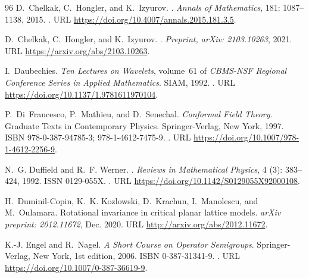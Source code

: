 \documentclass[a4paper, 11pt]{article}
\DeclareMathOperator{\1}{\mathds{1}}
\begin{document}
\begin{thebibliography}{96}
D.~Chelkak, C.~Hongler, and K.~Izyurov.
.
\newblock \emph{Annals of Mathematics}, 181: 1087--1138, 2015.
\newblock {}.
\newblock URL \url{https://doi.org/10.4007/annals.2015.181.3.5}.

D.~Chelkak, C.~Hongler, and K.~Izyurov.
.
\newblock \emph{Preprint, arXiv: 2103.10263}, 2021.
\newblock URL \url{https://arxiv.org/abs/2103.10263}.

I.~Daubechies.
\newblock \emph{{Ten Lectures on Wavelets}}, volume~61 of \emph{CBMS-NSF
  Regional Conference Series in Applied Mathematics}.
\newblock SIAM, 1992.
\newblock {}.
\newblock URL \url{https://doi.org/10.1137/1.9781611970104}.

P.~Di~Francesco, P.~Mathieu, and D.~Senechal.
\newblock \emph{{Conformal Field Theory}}.
\newblock Graduate Texts in Contemporary Physics. Springer-Verlag, New York,
  1997.
\newblock ISBN 978-0-387-94785-3; 978-1-4612-7475-9.
\newblock {}.
\newblock URL \url{https://doi.org/10.1007/978-1-4612-2256-9}.

N.~G. Duffield and R.~F. Werner.
.
\newblock \emph{Reviews in Mathematical Physics}, 4 (3):
  383--424, 1992.
\newblock ISSN 0129-055X.
\newblock {}.
\newblock URL \url{https://doi.org/10.1142/S0129055X92000108}.

H.~Duminil-Copin, K.~K. Kozlowski, D.~Krachun, I.~Manolescu, and M.~Oulamara.
\newblock Rotational invariance in critical planar lattice models.
\newblock \emph{arXiv preprint: 2012.11672}, Dec. 2020.
\newblock URL \url{http://arxiv.org/abs/2012.11672}.

K.-J. {Engel} and R.~{Nagel}.
\newblock \emph{{A Short Course on Operator Semigroups}}.
\newblock Springer-Verlag, New York, 1st edition, 2006.
\newblock ISBN 0-387-31341-9.
\newblock {}.
\newblock URL \url{https://doi.org/10.1007/0-387-36619-9}.


\end{thebibliography}
\end{document}
